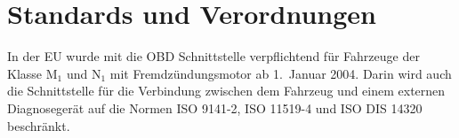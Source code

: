 \section{Standards und Verordnungen}
In der EU wurde mit \cite{EUDirective98/69/EC} die OBD Schnittstelle
verpflichtend für Fahrzeuge der Klasse M$_1$ und N$_1$ mit Fremdzündungsmotor
ab 1.~Januar 2004. Darin wird auch die Schnittstelle für die Verbindung
zwischen dem Fahrzeug und einem externen Diagnosegerät auf die Normen
ISO 9141-2, ISO 11519-4 und ISO DIS 14320 beschränkt.